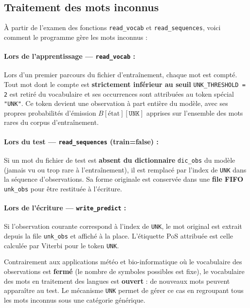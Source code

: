 \documentclass[12pt,a4paper]{article}
\begin{document}
\subsection{Traitement des mots inconnus}

À partir de l'examen des fonctions \texttt{read\_vocab} et \texttt{read\_sequences},
voici comment le programme gère les mots inconnus :

\paragraph{Lors de l'apprentissage --- \texttt{read\_vocab} :}
Lors d'un premier parcours du fichier d'entraînement, chaque mot est compté.
Tout mot dont le compte est \textbf{strictement inférieur au seuil}
\texttt{UNK\_THRESHOLD = 2} est retiré du vocabulaire et ses occurrences sont
attribuées au token spécial \texttt{"UNK"}.
Ce token devient une observation à part entière du modèle, avec ses propres
probabilités d'émission $B[\text{état}][\texttt{UNK}]$ apprises sur l'ensemble
des mots rares du corpus d'entraînement.

\paragraph{Lors du test --- \texttt{read\_sequences} (train=false) :}
Si un mot du fichier de test est \textbf{absent du dictionnaire} \texttt{dic\_obs}
du modèle (jamais vu ou trop rare à l'entraînement), il est remplacé par l'index
de \texttt{UNK} dans la séquence d'observations.
Sa forme originale est conservée dans une \textbf{file FIFO} \texttt{unk\_obs}
pour être restituée à l'écriture.

\paragraph{Lors de l'écriture --- \texttt{write\_predict} :}
Si l'observation courante correspond à l'index de \texttt{UNK}, le mot original
est extrait depuis la file \texttt{unk\_obs} et affiché à la place.
L'étiquette PoS attribuée est celle calculée par Viterbi pour le token \texttt{UNK}.

\begin{notebox}
Contrairement aux applications météo et bio-informatique où le vocabulaire
des observations est \textbf{fermé} (le nombre de symboles possibles est fixe),
le vocabulaire des mots en traitement des langues est \textbf{ouvert} : de nouveaux
mots peuvent apparaître au test. Le mécanisme \texttt{UNK} permet de gérer ce cas
en regroupant tous les mots inconnus sous une catégorie générique.
\end{notebox}
\end{document}
